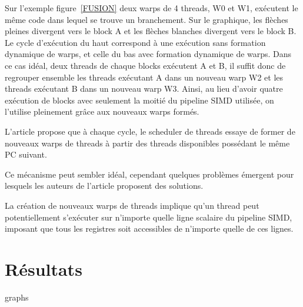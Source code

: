 \documentclass[11pt]{article}
\begin{document}
Sur l'exemple figure~\ref{FUSION} deux warps de 4 threads, W0 et W1, exécutent le même code dans lequel se trouve un branchement.
Sur le graphique, les flèches pleines divergent vers le block A et les flèches blanches divergent vers le block B.
Le cycle d'exécution du haut correspond à une exécution sans formation dynamique de warps, et celle du bas avec formation dynamique de warps.
Dans ce cas idéal, deux threads de chaque blocks exécutent A et B, il suffit donc de regrouper ensemble les threads exécutant A dans un nouveau warp W2 et les threads exécutant B dans un nouveau warp W3.
Ainsi, au lieu d'avoir quatre exécution de blocks avec seulement la moitié du pipeline SIMD utilisée, on l'utilise pleinement grâce aux nouveaux warps formés.

L'article propose que à chaque cycle, le scheduler de threads essaye de former de nouveaux warps de threads à partir des threads disponibles possédant le même PC suivant.

Ce mécanisme peut sembler idéal, cependant quelques problèmes émergent pour lesquels les auteurs de l'article proposent des solutions.

La création de nouveaux warps de threads implique qu'un thread peut potentiellement s'exécuter sur n'importe quelle ligne scalaire du pipeline SIMD, imposant que tous les registres soit accessibles de n'importe quelle de ces lignes.

\section{Résultats}

graphs
\end{document}
